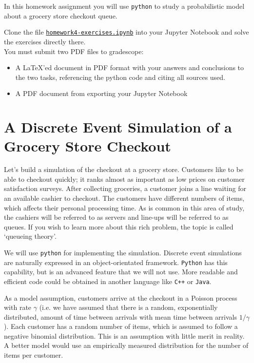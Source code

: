 \documentclass[letter]{article}
\newcommand{\setheader}[6]{
	\lhead{{\sc #1}\\{\sc #2}}%
	\rhead{
		{\bf #3} 
		\ifthenelse{\equal{#4}{}}{}{(#4)}\\
		{\bf #5} 
		\ifthenelse{\equal{#6}{}}{}{(#6)}%
	}
}
\begin{document}
	\setheader{APM348}{Homework 4}{Due: 5:59pm March 23}{}{}{}



In this homework assignment you will use \verb|python| to study a probabilistic model about a grocery store checkout queue.

Clone the file \href{https://utoronto.syzygy.ca/jupyter/user-redirect/git-pull?repo=https://github.com/bigfatbernie/IBLMathModeling&subPath=homeworks/homework4/homework4-exercises.ipynb}{\tt homework4-exercises.ipynb} into your Jupyter Notebook and solve the exercises directly there. \\

You must submit two PDF files to gradescope:
\begin{itemize}
	\item A \LaTeX'ed document in PDF format with your answers and conclusions to the two tasks, referencing the python code and citing all sources used.
	\item A PDF document from exporting your Jupyter Notebook
\end{itemize}



\section{A Discrete Event Simulation of a Grocery Store Checkout}



Let's build a simulation of the checkout at a grocery store. Customers like to be able to checkout quickly; it ranks almost as important as low prices on customer satisfaction surveys. After collecting groceries, a customer joins a line waiting for an available cashier to checkout. The customers have different numbers of items, which affects their personal processing time. As is common in this area of study, the cashiers will be referred to as servers and line-ups will be referred to as queues. If you wish to learn more about this rich problem, the topic is called `queueing theory'.

We will use \verb|python| for implementing the simulation. Discrete event simulations are naturally expressed in an object-orientated framework. \verb|Python| has this capability, but is an advanced feature that we will not use. More readable and efficient code could be obtained in another language like \verb|C++| or \verb|Java|.

As a model assumption, customers arrive at the checkout in a Poisson process with rate $\gamma$ (i.e. we have assumed that there is a random, exponentially distributed, amount of time between arrivals with mean time between arrivals $1/\gamma$). Each customer has a random number of items, which is assumed to follow a negative binomial distribution. This is an assumption with little merit in reality. A better model would use an empirically measured distribution for the number of items per customer.
\end{document}
